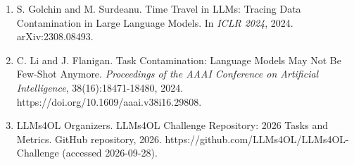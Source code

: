 \documentclass[
]{article}
\begin{document}
\begin{enumerate}
  arXiv:2310.17623, 2023. https://doi.org/10.48550/arXiv.2310.17623.
\item
  S. Golchin and M. Surdeanu. Time Travel in LLMs: Tracing Data
  Contamination in Large Language Models. In \emph{ICLR 2024}, 2024.
  arXiv:2308.08493.
\item
  C. Li and J. Flanigan. Task Contamination: Language Models May Not Be
  Few-Shot Anymore. \emph{Proceedings of the AAAI Conference on
  Artificial Intelligence}, 38(16):18471-18480, 2024.
  https://doi.org/10.1609/aaai.v38i16.29808.
\item
  LLMs4OL Organizers. LLMs4OL Challenge Repository: 2026 Tasks and
  Metrics. GitHub repository, 2026.
  https://github.com/LLMs4OL/LLMs4OL-Challenge (accessed 2026-09-28).
\end{enumerate}
\end{document}
